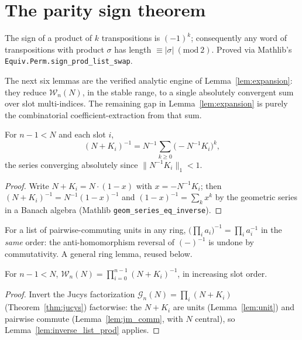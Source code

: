 \chapter{The parity sign theorem}\label{ch:parity}

\begin{lemma}\label{lem:sign_word}
\leanok
The sign of a product of $k$ transpositions is $(-1)^k$; consequently any
word of transpositions with product $\sigma$ has length
$\equiv|\sigma|\ (\mathrm{mod}\ 2)$. Proved via Mathlib's
\texttt{Equiv.Perm.sign\_prod\_list\_swap}.
\end{lemma}

The next six lemmas are the verified analytic engine of
Lemma~\ref{lem:expansion}: they reduce $\mathcal W_n(N)$, in the stable range,
to a single absolutely convergent sum over slot multi-indices. The remaining
gap in Lemma~\ref{lem:expansion} is purely the combinatorial
coefficient-extraction from that sum.

\begin{lemma}\label{lem:inverse_factor}
\leanok
{}
For $n-1<N$ and each slot $i$,
\[
(N+K_i)^{-1}=N^{-1}\sum_{k\ge0}\bigl(-N^{-1}K_i\bigr)^{k},
\]
the series converging absolutely since $\|N^{-1}K_i\|_1<1$.
\end{lemma}
\begin{proof}\leanok{}
Write $N+K_i=N\cdot(1-x)$ with $x=-N^{-1}K_i$; then
$(N+K_i)^{-1}=N^{-1}(1-x)^{-1}$ and $(1-x)^{-1}=\sum_k x^k$ by the geometric
series in a Banach algebra (Mathlib \texttt{geom\_series\_eq\_inverse}).
\end{proof}

\begin{lemma}\label{lem:inverse_list_prod}
\leanok
For a list of pairwise-commuting units in any ring,
$\bigl(\prod_i a_i\bigr)^{-1}=\prod_i a_i^{-1}$ in the \emph{same} order: the
anti-homomorphism reversal of $(-)^{-1}$ is undone by commutativity. A general
ring lemma, reused below.
\end{lemma}

\begin{lemma}\label{lem:wg_prod_inverse}
\leanok
{}
For $n-1<N$, $\displaystyle \mathcal W_n(N)=\prod_{i=0}^{n-1}(N+K_i)^{-1}$, in
increasing slot order.
\end{lemma}
\begin{proof}\leanok{}
Invert the Jucys factorization $\mathcal G_n(N)=\prod_i(N+K_i)$
(Theorem~\ref{thm:jucys}) factorwise: the $N+K_i$ are units
(Lemma~\ref{lem:unit}) and pairwise commute (Lemma~\ref{lem:jm_comm}, with $N$
central), so Lemma~\ref{lem:inverse_list_prod} applies.
\end{proof}

